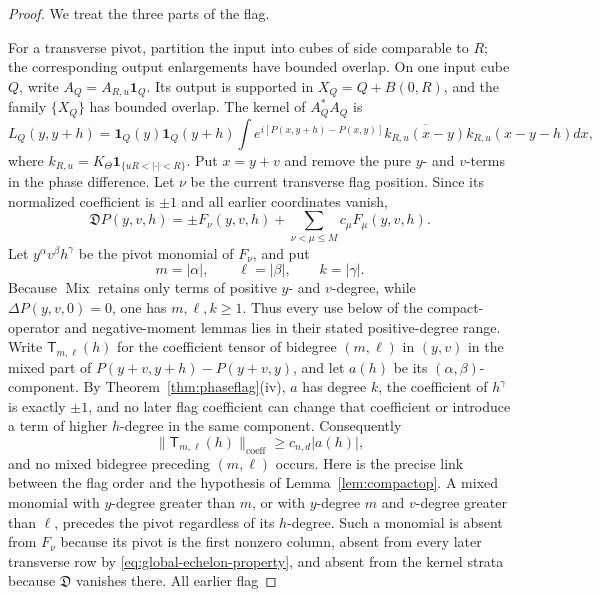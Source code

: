 \documentclass[11pt]{article}
\numberwithin{equation}{section}
\theoremstyle{remark}
\theoremstyle{definition}
\newcommand{\Mix}{\operatorname{Mix}}
\newcommand{\Dop}{\mathfrak D}
\newcommand{\norm}[1]{\lVert #1\rVert}
\begin{document}
\begin{proof}
We treat the three parts of the flag.

For a transverse pivot, partition the input into cubes of side comparable
to $R$; the corresponding output enlargements have bounded overlap.  On
one input cube $Q$, write $A_Q=A_{R,u}\mathbf1_Q$.  Its output is supported
in $X_Q=Q+B(0,R)$, and the family $\{X_Q\}$ has bounded overlap.  The
kernel of $A_Q^*A_Q$ is
\[
 L_Q(y,y+h)=\mathbf1_Q(y)\mathbf1_Q(y+h)
 \int e^{i[P(x,y+h)-P(x,y)]}
 \overline{k_{R,u}(x-y)}k_{R,u}(x-y-h)dx,
\]
where $k_{R,u}=K_\Theta\mathbf1_{\{uR<|\cdot|<R\}}$.  Put $x=y+v$ and
remove the pure $y$- and $v$-terms in the phase difference.  Let $\nu$ be
the current transverse flag position.  Since its normalized coefficient is
$\pm1$ and all earlier coordinates vanish,
\begin{equation}\label{eq:transverse-pivot-expansion}
 \Dop P(y,v,h)=\pm F_\nu(y,v,h)
  +\sum_{\nu<\mu\le M}c_\mu F_\mu(y,v,h).
\end{equation}
Let $y^\alpha v^\beta h^\gamma$ be the pivot monomial of $F_\nu$, and put
\[
 m=|\alpha|,\qquad \ell=|\beta|,\qquad k=|\gamma|.
\]
Because $\Mix$ retains only terms of positive $y$- and $v$-degree, while
$\Delta P(y,v,0)=0$, one has $m,\ell,k\ge1$.  Thus every use below of the
compact-operator and negative-moment lemmas lies in their stated
positive-degree range.
Write $\mathsf T_{m,\ell}(h)$ for the coefficient tensor of bidegree
$(m,\ell)$ in $(y,v)$ in the mixed part of
$P(y+v,y+h)-P(y+v,y)$, and let $a(h)$ be its
$(\alpha,\beta)$-component.  By Theorem~\ref{thm:phaseflag}(iv), $a$ has
degree $k$, the coefficient of $h^\gamma$ is exactly $\pm1$, and no later
flag coefficient can change that coefficient or introduce a term of higher
$h$-degree in the same component.  Consequently
\begin{equation}\label{eq:transverse-tensor-lower-bound}
 \norm{\mathsf T_{m,\ell}(h)}_{\mathrm{coeff}}
 \ge c_{n,d}|a(h)|,
\end{equation}
and no mixed bidegree preceding $(m,\ell)$ occurs.  Here is the precise
link between the flag order and the hypothesis of
Lemma~\ref{lem:compactop}.  A mixed monomial with $y$-degree greater than
$m$, or with $y$-degree $m$ and $v$-degree greater than $\ell$, precedes
the pivot regardless of its $h$-degree.  Such a monomial is absent from
$F_\nu$ because its pivot is the first nonzero column, absent from every
later transverse row by \eqref{eq:global-echelon-property}, and absent
from the kernel strata because $\Dop$ vanishes there.  All earlier flag

\end{proof}
\end{document}
